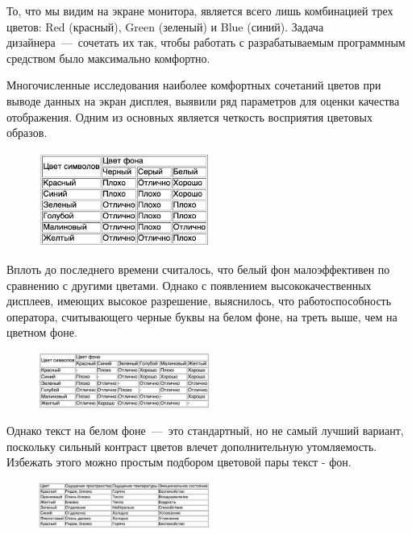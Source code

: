 \documentclass[14pt]{extarticle}
\begin{document}
То, что мы видим на экране монитора, является всего лишь комбинацией трех цветов: Red (красный), Green (зеленый) и Blue (синий). Задача дизайнера~---~сочетать их так, чтобы работать с разрабатываемым программным средством было максимально комфортно.

Многочисленные исследования наиболее комфортных сочетаний цветов при выводе данных на экран дисплея, выявили ряд параметров для оценки качества отображения. Одним из основных является четкость восприятия цветовых образов.

\begin{figure}[ht]
    \centering
    \includegraphics[width=0.5\textwidth]{assets/1.jpeg}
\end{figure}

Вплоть до последнего времени считалось, что белый фон малоэффективен по сравнению с другими цветами. Однако с появлением высококачественных дисплеев, имеющих высокое разрешение, выяснилось, что работоспособность оператора, считывающего черные буквы на белом фоне, на треть выше, чем на цветном фоне.

\begin{figure}[ht]
    \centering
    \includegraphics[width=0.5\textwidth]{assets/2.jpeg}
\end{figure}

Однако текст на белом фоне~---~это стандартный, но не самый лучший вариант, поскольку сильный контраст цветов влечет дополнительную утомляемость. Избежать этого можно простым подбором цветовой пары текст - фон.

\begin{figure}[ht]
    \centering
    \includegraphics[width=0.5\textwidth]{assets/3.jpeg}
\end{figure}
\end{document}
